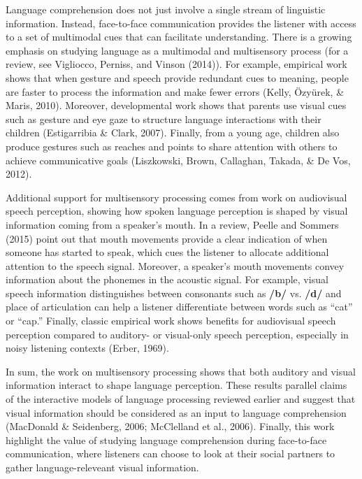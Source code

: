 \documentclass[english,floatsintext,man]{apa6}
\begin{document}
Language comprehension does not just involve a single stream of
linguistic information. Instead, face-to-face communication provides the
listener with access to a set of multimodal cues that can facilitate
understanding. There is a growing emphasis on studying language as a
multimodal and multisensory process (for a review, see Vigliocco,
Perniss, and Vinson (2014)). For example, empirical work shows that when
gesture and speech provide redundant cues to meaning, people are faster
to process the information and make fewer errors (Kelly, Özyürek, \&
Maris, 2010). Moreover, developmental work shows that parents use visual
cues such as gesture and eye gaze to structure language interactions
with their children (Estigarribia \& Clark, 2007). Finally, from a young
age, children also produce gestures such as reaches and points to share
attention with others to achieve communicative goals (Liszkowski, Brown,
Callaghan, Takada, \& De Vos, 2012).

Additional support for multisensory processing comes from work on
audiovisual speech perception, showing how spoken language perception is
shaped by visual information coming from a speaker's mouth. In a review,
Peelle and Sommers (2015) point out that mouth movements provide a clear
indication of when someone has started to speak, which cues the listener
to allocate additional attention to the speech signal. Moreover, a
speaker's mouth movements convey information about the phonemes in the
acoustic signal. For example, visual speech information distinguishes
between consonants such as \textbf{/b/} vs. \textbf{/d/} and place of
articulation can help a listener differentiate between words such as
\enquote{cat} or \enquote{cap.} Finally, classic empirical work shows
benefits for audiovisual speech perception compared to auditory- or
visual-only speech perception, especially in noisy listening contexts
(Erber, 1969).

In sum, the work on multisensory processing shows that both auditory and
visual information interact to shape language perception. These results
parallel claims of the interactive models of language processing
reviewed earlier and suggest that visual information should be
considered as an input to language comprehension (MacDonald \&
Seidenberg, 2006; McClelland et al., 2006). Finally, this work highlight
the value of studying language comprehension during face-to-face
communication, where listeners can choose to look at their social
partners to gather language-releveant visual information.
\end{document}

